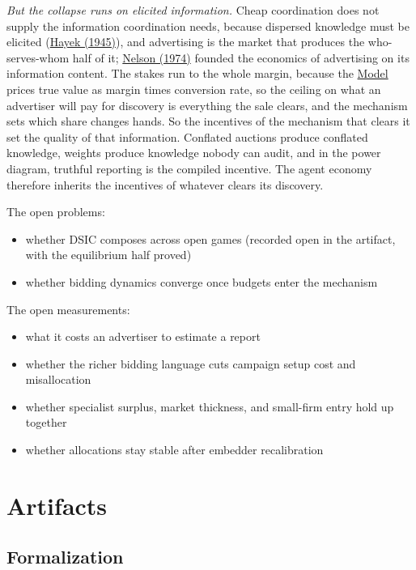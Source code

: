 \emph{But the collapse runs on elicited information.} Cheap coordination
does not supply the information coordination needs, because dispersed
knowledge must be elicited
(\href{https://www.econlib.org/library/Essays/hykKnw.html}{Hayek
(1945)}), and advertising is the market that produces the
who-serves-whom half of it;
\href{https://www.journals.uchicago.edu/doi/abs/10.1086/260231}{Nelson
(1974)} founded the economics of advertising on its information content.
The stakes run to the whole margin, because the \hyperref[model]{Model}
prices true value as margin times conversion rate, so the ceiling on
what an advertiser will pay for discovery is everything the sale clears,
and the mechanism sets which share changes hands. So the incentives of
the mechanism that clears it set the quality of that information.
Conflated auctions produce conflated knowledge, weights produce
knowledge nobody can audit, and in the power diagram, truthful reporting
is the compiled incentive. The agent economy therefore inherits the
incentives of whatever clears its discovery.

The open problems:

\begin{itemize}
\tightlist
\item
  whether DSIC composes across open games (recorded open in the
  artifact, with the equilibrium half proved)
\item
  whether bidding dynamics converge once budgets enter the mechanism
\end{itemize}

The open measurements:

\begin{itemize}
\tightlist
\item
  what it costs an advertiser to estimate a report
\item
  whether the richer bidding language cuts campaign setup cost and
  misallocation
\item
  whether specialist surplus, market thickness, and small-firm entry
  hold up together
\item
  whether allocations stay stable after embedder recalibration
\end{itemize}

\section*{Artifacts}\label{artifacts}

\subsection*{Formalization}\label{formalization}

